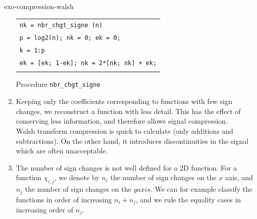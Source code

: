 \begin{correction}{exo-compression-walsh}
\begin{enumerate}
\begin{listing} 
\begin{footnotesize} 
{\upshape
\begin{tabular}{l} \texttt{\pfunction nk = nbr\_chgt\_signe (n)} \\
\texttt{p = log2(n); nk = 0; ek = 0;} \\
\texttt{\pfor k = 1:p} \\
\texttt{\quad ek = [ek; 1-ek]; nk = 2*[nk; nk] + ek;} \\
\texttt{\pend} \\
\end{tabular}
}
\end{footnotesize}
\caption{Procedure \texttt{\upshape nbr\_chgt\_signe}}
\label{listing-nbrchgtsigne}
\end{listing}
 
\item Keeping only the coefficients corresponding to functions with few sign changes, we reconstruct a function with less detail. This has the effect of conserving less information, and therefore allows signal compression. \\Walsh transform compression is quick to calculate (only additions and subtractions). On the other hand, it introduces discontinuities in the signal which are often unacceptable.
\item The number of sign changes is not well defined for a 2D function. For a function $ \chi_{i, j} $, we denote by $ n_i $ the number of sign changes on the $ x $ axis, and $ n_j $ the number of sign changes on the $ y axis $. We can for example classify the functions in order of increasing $ n_i + n_j $, and we rule the equality cases in increasing order of $ n_j $.
\end{enumerate}
\end{correction}
 
